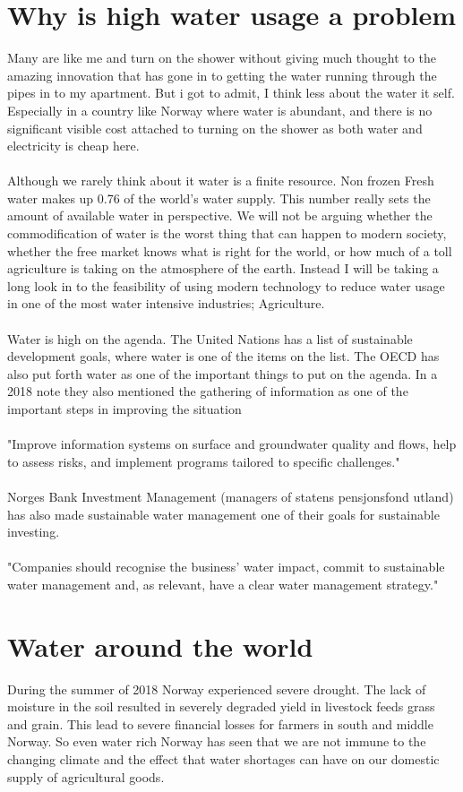 \documentclass[]{uiophd}
\begin{document}
\section{Why is high water usage a problem}
Many are like me and turn on the shower without giving much thought to the amazing innovation that has gone in to getting the water running through the pipes in to my apartment. But i got to admit, I think less about the water it self. Especially in a country like Norway where water is abundant, and there is no significant visible cost attached to turning on the shower as both water and electricity is cheap here.
\\\\
Although we rarely think about it water is a finite resource. Non frozen Fresh water makes up 0.76 of the world's water supply.\parencite{WaterinCrisis} This number really sets the amount of available water in perspective. We will not be arguing whether the commodification of water is the worst thing that can happen to modern society, whether the free market knows what is right for the world, or how much of a toll agriculture is taking on the atmosphere of the earth. Instead I will be taking a long look in to the feasibility of using modern technology to reduce water usage in one of the most water intensive industries; Agriculture. \parencite{WorldBank}
\\\\
Water is high on the agenda. The United Nations has a list of sustainable development goals, where water is one of the items on the list. The OECD has also put forth water as one of the important things to put on the agenda. In a 2018 note they also mentioned the gathering of information as one of the important steps in improving the situation 
\\\\
"Improve information systems on surface and groundwater quality and flows, help to assess risks, and implement programs tailored to specific challenges."
\\\\
Norges Bank Investment Management (managers of statens pensjonsfond utland) has also made sustainable water management one of their goals for sustainable investing. 
\\\\
"Companies should recognise the business’
water impact, commit to sustainable water
management and, as relevant, have a clear
water management strategy." \parencite{latex2e}

\section{Water around the world}
 During the summer of 2018 Norway experienced severe drought. The lack of moisture in the soil resulted in severely degraded yield in livestock feeds grass and grain. This lead to severe financial losses for farmers in south and middle Norway. \parencite{nve} So even water rich Norway has seen that we are not immune to the changing climate and the effect that water shortages can have on our domestic supply of agricultural goods. 
\end{document}
